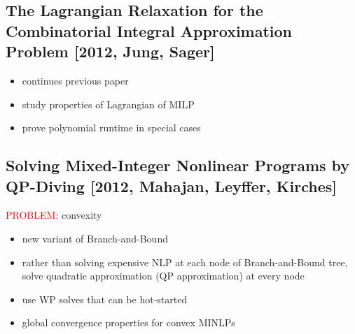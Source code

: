 \documentclass{article}
\begin{document}
\subsection{The Lagrangian Relaxation for the Combinatorial Integral Approximation Problem [2012, Jung, Sager]}
\begin{itemize}
\item continues previous paper
\item study properties of Lagrangian of MILP
\item prove polynomial runtime in special cases
\end{itemize}
\subsection{Solving Mixed-Integer Nonlinear Programs by QP-Diving [2012, Mahajan, Leyffer, Kirches]}
\textcolor{red}{PROBLEM:} convexity
\begin{itemize}
\item new variant of Branch-and-Bound
\item rather than solving expensive NLP at each node of Branch-and-Bound tree, solve quadratic approximation (QP approximation) at every node
\item use WP solves that can be hot-started
\item global convergence properties for convex MINLPs
\end{itemize}
\end{document}

